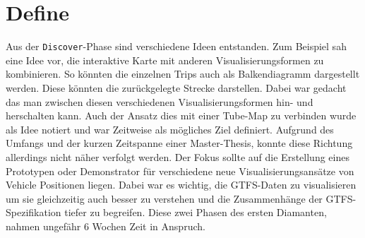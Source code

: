 \section{Define}
\label{sec:define}
  Aus der \texttt{Discover}-Phase sind verschiedene Ideen entstanden. Zum Beispiel sah eine Idee vor, die interaktive Karte mit anderen Visualisierungsformen zu kombinieren. So könnten die einzelnen Trips auch als Balkendiagramm dargestellt werden. Diese könnten die zurückgelegte Strecke darstellen. Dabei war gedacht das man zwischen diesen verschiedenen Visualisierungsformen hin- und herschalten kann. Auch der Ansatz dies mit einer Tube-Map zu verbinden wurde als Idee notiert und war Zeitweise als mögliches Ziel definiert. Aufgrund des Umfangs und der kurzen Zeitspanne einer Master-Thesis, konnte diese Richtung allerdings nicht näher verfolgt werden. Der Fokus sollte auf die Erstellung eines Prototypen oder Demonstrator für verschiedene neue Visualisierungsansätze von Vehicle Positionen liegen. Dabei war es wichtig, die GTFS-Daten zu visualisieren um sie gleichzeitig auch besser zu verstehen und die Zusammenhänge der GTFS-Spezifikation tiefer zu begreifen. Diese zwei Phasen des ersten Diamanten, nahmen ungefähr 6 Wochen Zeit in Anspruch.
  
  
